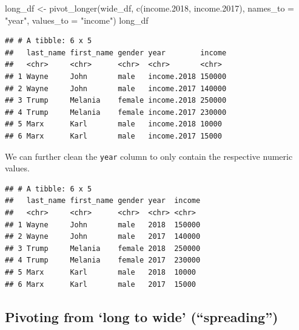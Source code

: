 \documentclass[
  12pt,
]{style/krantz}
\newenvironment{Shaded}{\begin{snugshade}}{\end{snugshade}}
\newcommand{\AttributeTok}[1]{\textcolor[rgb]{0.77,0.63,0.00}{#1}}
\newcommand{\FloatTok}[1]{\textcolor[rgb]{0.00,0.00,0.81}{#1}}
\newcommand{\FunctionTok}[1]{\textcolor[rgb]{0.00,0.00,0.00}{#1}}
\newcommand{\NormalTok}[1]{#1}
\newcommand{\OtherTok}[1]{\textcolor[rgb]{0.56,0.35,0.01}{#1}}
\newcommand{\SpecialCharTok}[1]{\textcolor[rgb]{0.00,0.00,0.00}{#1}}
\newcommand{\StringTok}[1]{\textcolor[rgb]{0.31,0.60,0.02}{#1}}
\begin{document}
\begin{Shaded}
\begin{Highlighting}[]
\NormalTok{long\_df }\OtherTok{\textless{}{-}} \FunctionTok{pivot\_longer}\NormalTok{(wide\_df, }\FunctionTok{c}\NormalTok{(income}\FloatTok{.2018}\NormalTok{, income}\FloatTok{.2017}\NormalTok{), }\AttributeTok{names\_to =} \StringTok{"year"}\NormalTok{, }\AttributeTok{values\_to =} \StringTok{"income"}\NormalTok{)}
\NormalTok{long\_df}
\end{Highlighting}
\end{Shaded}

\begin{verbatim}
## # A tibble: 6 x 5
##   last_name first_name gender year        income
##   <chr>     <chr>      <chr>  <chr>       <chr> 
## 1 Wayne     John       male   income.2018 150000
## 2 Wayne     John       male   income.2017 140000
## 3 Trump     Melania    female income.2018 250000
## 4 Trump     Melania    female income.2017 230000
## 5 Marx      Karl       male   income.2018 10000 
## 6 Marx      Karl       male   income.2017 15000
\end{verbatim}

We can further clean the \texttt{year} column to only contain the respective numeric values.

\begin{Shaded}
\end{Shaded}

\begin{verbatim}
## # A tibble: 6 x 5
##   last_name first_name gender year  income
##   <chr>     <chr>      <chr>  <chr> <chr> 
## 1 Wayne     John       male   2018  150000
## 2 Wayne     John       male   2017  140000
## 3 Trump     Melania    female 2018  250000
## 4 Trump     Melania    female 2017  230000
## 5 Marx      Karl       male   2018  10000 
## 6 Marx      Karl       male   2017  15000
\end{verbatim}

\hypertarget{pivoting-from-long-to-wide-spreading}{%
\subsection{Pivoting from `long to wide' (``spreading'')}\label{pivoting-from-long-to-wide-spreading}}
\end{document}
